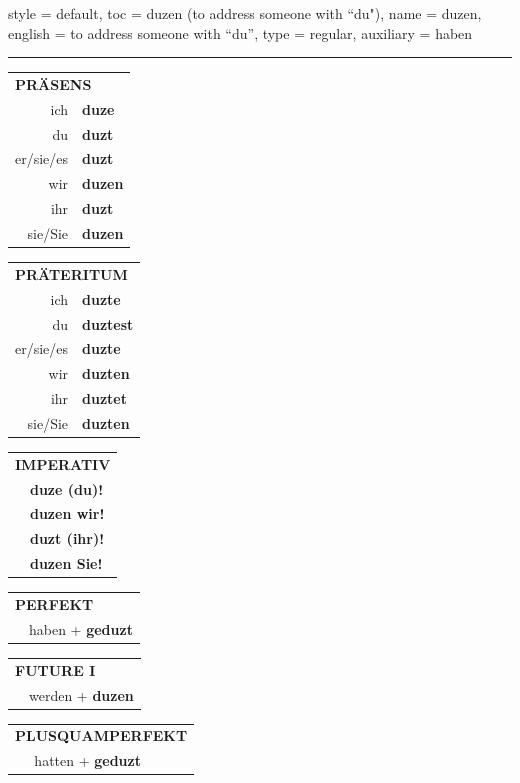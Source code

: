 \begin{verbentry}{
  style = {default},
  toc = {duzen (to address someone with ``du")},
  name = {duzen},
  english = {to address someone with \enquote{du}},
  type = {regular},
  auxiliary = {haben}
}


\vspace{5pt}
\hrule
\vspace{5pt}

\begin{tabular}{rl}
\multicolumn{2}{l}{\textbf{PRÄSENS}}\\
ich & \textbf{duze}\\
du & \textbf{duzt}\\
er/sie/es & \textbf{duzt}\\
wir & \textbf{duzen}\\
ihr & \textbf{duzt}\\
sie/Sie & \textbf{duzen}\\
\end{tabular}
\hfill
\begin{tabular}{rl}
\multicolumn{2}{l}{\textbf{PRÄTERITUM}}\\
ich & \textbf{duzte}\\
du & \textbf{duztest}\\
er/sie/es & \textbf{duzte}\\
wir & \textbf{duzten}\\
ihr & \textbf{duztet}\\
sie/Sie & \textbf{duzten}\\
\end{tabular}
\hfill
\begin{tabular}{rl}
\multicolumn{2}{l}{\textbf{IMPERATIV}}\\
& \textbf{duze (du)!}\\
& \textbf{duzen wir!}\\
& \textbf{duzt (ihr)!}\\
& \textbf{duzen Sie!}\\
\end{tabular}

\vspace{10pt}

\begin{tabular}{rl}
\multicolumn{2}{l}{\textbf{PERFEKT}}\\
& haben + \textbf{geduzt}\\
\end{tabular}
\hfill
\begin{tabular}{rl}
\multicolumn{2}{l}{\textbf{FUTURE I}}\\
& werden + \textbf{duzen}\\
\end{tabular}
\hfill
\begin{tabular}{rl}
\multicolumn{2}{l}{\textbf{PLUSQUAMPERFEKT}}\\
& hatten + \textbf{geduzt}\\
\end{tabular}


\end{verbentry}
